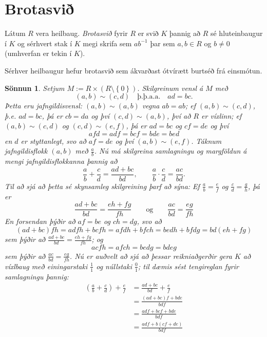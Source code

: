 \documentclass[a4paper,icelandic,11pt]{book}
\theoremstyle{plain}
\newtheorem*{sonnun}{Sönnun}
\begin{document}
\section{Brotasvið}
\begin{skilgr}
  Látum $R$ vera heilbaug.
  \emph{Brotasvið} fyrir $R$ er svið
  $K$ þannig að $R$ sé hluteinbaugur í $K$ og sérhvert stak í $K$ megi skrifa
  sem $ab^{-1}$ þar sem $a,b\in R$ og $b\neq 0$ (umhverfan er tekin í $K$).
\end{skilgr}
\begin{setn}
  Sérhver heilbaugur hefur brotasvið sem ákvarðast ótvírætt burtséð frá
  einsmótun.
\end{setn}
\begin{sonnun}
  Setjum $M := R\times(R\setminus \left\{ 0 \right\})$. Skilgreinum vensl á
  $M$ með\[
  (a,b) \sim (c,d) 
  \quad\text{þ.þ.a.a.}\quad
  ad = bc.
  \]
  Þetta eru jafngildisvensl: $(a,b)\sim(a,b)$ vegna $ab = ab$; ef
  $(a,b)\sim(c,d)$, þ.e. $ad = bc$, þá er $cb = da$ og því $(c,d)\sim(a,b)$, því
  að $R$ er víxlinn; ef $(a,b)\sim(c,d)$ og $(c,d)\sim(e,f)$, þá er $ad = bc$ og
  $cf = de$ og því\[
  afd = adf = bcf = bde = bed
  \]
  en $d$ er styttanlegt, svo að $af = de$ og því $(a,b)\sim(e,f)$. Táknum
  jafngildisflokk $(a,b)$ með $\frac ab$. Nú má skilgreina samlagningu og
  margföldun á mengi jafngildisflokkanna þannig að\[
  \frac ab + \frac cd = \frac{ad + bc}{bd},
  \qquad
  \frac ab \cdot \frac cd = \frac{ac}{bd}.
  \]
  Til að sjá að þetta sé skynsamleg skilgreining þarf að sýna: Ef $\frac ab =
  \frac ef$ og $\frac cd = \frac gh$, þá er\[
  \frac{ad + bc}{bd} = \frac{eh + fg}{fh}
  \qquad\text{og}\qquad
  \frac{ac}{bd} = \frac{eg}{fh}
  \]
  En forsendan þýðir að $af = be$ og $ch = dg$, svo að\[
  (ad + bc)fh = adfh+bcfh = afdh+bfch=bedh+bfdg=bd(eh+fg)
  \]
  sem þýðir að $\frac{ad+bc}{bd} = \frac{eh+fg}{fh}$; og\[
  acfh = afch = bedg = bdeg
  \]
  sem þýðir að $\frac{ac}{bd} = \frac{eg}{fh}$. Nú er auðvelt að sjá að þessar
  reikniaðgerðir gera $K$ að víxlbaug með einingarstaki $\frac 11$ og núllstaki
  $\frac 01$; til dæmis sést tengireglan fyrir samlagningu þannig: 
  \begin{align*}
    \left( \frac ab + \frac cd \right) + \frac ef
    &= \frac{ad+bc}{bd}+\frac ef \\
    &= \frac{(ad + bc)f+bde}{bdf} \\
    &= \frac{adf + bcf + bde}{bdf} \\
    &= \frac{adf + b(cf + de)}{bdf} \\

\end{align*}
\end{sonnun}
\end{document}

